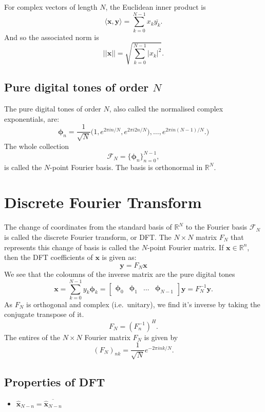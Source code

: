\documentclass[a4paper, 11pt, notitlepage, english]{article}
\newcommand{\bt}[1]{\boldsymbol{#1}}
\begin{document}
For complex vectors of length $N$, the Euclidean inner product is
$$\langle \bt{x}, \bt{y} \rangle = \sum_{k=0}^{N-1} x_k \overline{y_k}.$$
And so the associated norm is
$$||\bt{x}|| = \sqrt{\sum_{k=0}^{N-1} |x_k|^2}.$$

\subsection*{Pure digital tones of order $N$}
The pure digital tones of order $N$, also called the normalised complex exponentials, are:
$$\bt{\phi}_n = \frac{1}{\sqrt{N}}\big(1, e^{2\pi i n/N}, e^{2\pi i 2n/N}), \ldots, e^{2\pi i n(N-1)/N}.)$$
The whole collection
$$\mathcal{F}_N = \big\{\bt{\phi}_n\big\}_{n=0}^{N-1},$$
is called the $N$-point Fourier basis. The basis is orthonormal in $\mathbb{R}^N.$

\section*{Discrete Fourier Transform}
The change of coordinates from the standard basis of $\mathbb{R}^N$ to the Fourier basis $\mathcal{F}_N$ is called the discrete Fourier transform, or DFT. The $N\times N$ matrix $F_N$ that represents this change of basis is called the $N$-point Fourier matrix. If $\bt{x} \in \mathbb{R}^n$, then the DFT coefficients of $\bt{x}$ is given as:
$$\bt{y} = F_N \bt{x}$$
We see that the coloumns of the inverse matrix are the pure digital tones
$$\bt{x} = \sum_{k=0}^{N-1}y_k\bt{\phi}_k = \begin{bmatrix}
    \bt{\phi}_0 & \bt{\phi}_1 & \ldots & \bt{\phi}_{N-1}
\end{bmatrix}\bt{y} = F_N^{-1} \bt{y}.$$
As $F_N$ is orthogonal and complex (i.e.\ unitary), we find it's inverse by taking the conjugate transpose of it.
$$F_N = (F_n^{-1})^H.$$
The entires of the $N\times N$ Fourier matrix $F_N$ is given by
$$(F_N)_{nk} = \frac{1}{\sqrt{N}}e^{-2\pi i n k/N}.$$

\subsection*{Properties of DFT}
\begin{itemize}
    \item $\bt{\hat{x}}_{N-n} = \overline{\bt{\hat{x}}_{N-n}}$
\end{itemize}
\end{document}

